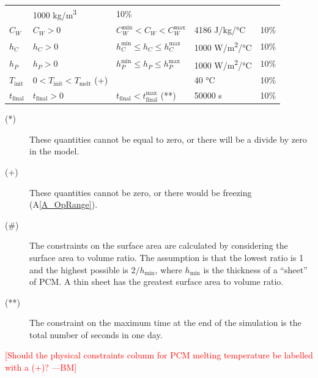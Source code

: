 \documentclass[12pt]{article}
\newcommand{\authornote}[3]{\textcolor{#1}{[#3 ---#2]}}
\newcommand{\authornote}[3]{}
\newcommand{\bmac}[1]{\authornote{red}{BM}{#1}}
\newcommand{\aref}[1]{A\ref{#1}}
\begin{document}
\begin{table}[!h]
\begin{longtable*}{l l l l c}
	& 1000 \si[per-mode=symbol] {\kilo\gram\per\cubic\metre} & 10\%
  \\
  $C_W$ & $C_W > 0$ & $C_W^{\text{min}} < C_W < C_W^{\text{max}}$ & 4186 
	\si[per-mode=symbol] {\joule\per\kilo\gram\per\celsius} & 10\%
  \\
  $h_C$ & $h_C > 0$ & $h_C^{\text{min}} \leq h_C \leq h_C^{\text{max}}$ 
	& 1000 \si[per-mode=symbol] {\watt\per\square\metre\per\celsius} & 10\%
  \\
  $h_P$ & $h_P > 0$ & $h_P^{\text{min}} \leq h_P \leq h_P^{\text{max}}$ 
	& 1000 \si[per-mode=symbol] {\watt\per\square\metre\per\celsius} & 10\%
  \\
  $T_\text{init}$ & $0 < T_\text{init} < T_\text{melt} $ (+) & & 40 \si[per-mode=symbol] {\celsius} & 10\%
  \\
  $t_\text{final}$ & $t_\text{final} > 0$ & $t_\text{final} < t_{\text{final}}^{\text{max}}$ (**) 
		& 50000 \si[per-mode=symbol] {\second} & 10\%
  \\
  \bottomrule
\end{longtable*}
\end{table}

\noindent 
\begin{description}
\item[(*)] These quantities cannot be equal to zero, or there will be a divide
  by zero in the model.
\item[(+)] These quantities cannot be zero, or there would be freezing
  (\aref{A_OpRange}).
\item[(\#)] The constraints on the surface area are calculated by considering
  the surface area to volume ratio.  The assumption is that the lowest ratio is
  1 and the highest possible is $2/h_\text{min}$, where $h_\text{min}$ is the
  thickness of a ``sheet'' of PCM.  A thin sheet has the greatest surface area to
  volume ratio.
\item[(**)] The constraint on the maximum time at the end of the simulation is 
	the total number of seconds in one day.

\end{description}

\bmac{Should the physical constraints column for PCM melting temperature be labelled with a (+)?}
\end{document}
